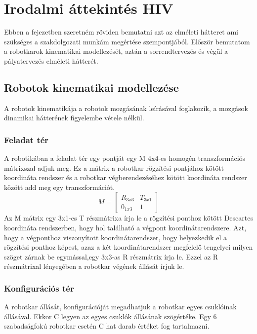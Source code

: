 \chapter{Irodalmi áttekintés HIV}

Ebben a fejezetben szeretném röviden bemutatni azt az elméleti hátteret ami szükséges a szakdolgozati munkám megértése szempontjából. Először bemutatom a robotkarok kinematikai modellezését, aztán a sorrendtervezés és végül a pályatervezés elméleti hátterét. 

\section{Robotok kinematikai modellezése}

A robotok kinematikája a robotok mozgásának leírásával foglakozik, a mozgások dinamikai hátterének figyelembe vétele nélkül. 

\subsection{Feladat tér}

A robotikában a feladat tér egy pontját egy M  4x4-es homogén transzformációs mátrixszal adjuk meg. Ez a mátrix a robotkar rögzítési pontjához kötött koordináta rendszer és a robotkar végberendezéséhez kötött koordináta rendszer között add meg egy transzformációt.
$$ M = 
\begin{bmatrix}
  R_{3x3} & T_{3x1}\\
  0_{1x3} & 1
\end{bmatrix}$$
Az M mátrix egy 3x1-es T részmátrixa írja le a rögzítési ponthoz kötött Descartes koordináta rendszerben, hogy hol található a végpont koordinátarendszere. Azt, hogy a végponthoz viszonyított koordinátarendszer, hogy helyezkedik el a rögzítési ponthoz képest, azaz a két koordinátarendszer megfelelő tengelyei milyen szöget zárnak be egymással,egy 3x3-as R részmátrix írja le. Ezzel az R részmátrixal lényegében a robotkar végének állását írjuk le. 
\cite{Alatartsev:2015}

\subsection{Konfigurációs tér}

A robotkar állását, konfigurációját megadhatjuk a robotkar egyes csuklóinak állásával. Ekkor C legyen az egyes csuklók állásának szögértéke. Egy 6 szabadságfokú robotkar esetén C hat darab értéket fog tartalmazni.

